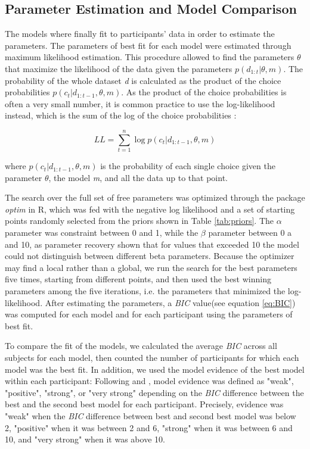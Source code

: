 \documentclass[a4paper,12pt]{article}
\begin{document}
\subsection{Parameter Estimation and Model Comparison}
The models where finally fit to participants' data in order to estimate the parameters. The parameters of best fit for each model were estimated through maximum likelihood estimation. This procedure allowed to find the parameters $\theta$ that maximize the likelihood of the data given the parameters $p(d_{1:t} | \theta, m )$. 
The probability of the whole dataset \textit{d} is calculated as the product of the choice probabilities $p(c_t | d_{1:t-1}, \theta, m)$. As the product of the choice probabilities is often a very small number, it is common practice to use the log-likelihood instead, which is the sum of the log of the choice probabilities \cite{Daw2011, Wilson2019a}:

\begin{equation}
LL = \sum_{t=1}^{n} \log{p(c_t | d_{1:t-1} , \theta, m)}
\end{equation}

\noindent
where $p(c_t | d_{1:t-1}, \theta, m)$ is the probability of each single choice given the parameter $\theta$, the model \textit{m}, and all the data up to that point. \par
The search over the full set of free parameters was optimized through the package \textit{optim} in R, which was fed with the negative log likelihood and a set of starting points randomly selected from the priors shown in Table \ref{tab:priors}. The $\alpha$ parameter was constraint between 0 and 1, while the $\beta$ parameter between 0 a and 10, as parameter recovery shown that for values that exceeded 10 the model could not distinguish between different beta parameters. Because the optimizer may find a local rather than a global, we run the search for the best parameters five times, starting from different points, and then used the best winning parameters among the five iterations, i.e. the parameters that minimized the log-likelihood. 
After estimating the parameters, a \textit{BIC} value(see equation \ref{eq:BIC}) was computed for each model and for each participant using the parameters of best fit. \par
To compare the fit of the models, we calculated the average \textit{BIC} across all subjects for each model, then counted the number of participants for which each model was the best fit. In addition, we used the model evidence of the best model within each participant: Following \cite{raftery1995bayesian} and \cite{gluth2017attraction}, model evidence was defined as "weak", "positive", "strong", or "very strong" depending on the \textit{BIC} difference between the best and the second best model for each participant. Precisely, evidence was "weak" when the \textit{BIC} difference between best and second best model was below 2, "positive" when it was between 2 and 6, "strong" when it was between 6 and 10, and "very strong" when it was above 10. 
\end{document}
